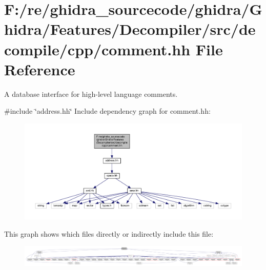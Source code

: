 \hypertarget{comment_8hh}{}\section{F\+:/re/ghidra\+\_\+sourcecode/ghidra/\+Ghidra/\+Features/\+Decompiler/src/decompile/cpp/comment.hh File Reference}
\label{comment_8hh}


A database interface for high-\/level language comments.  


{\ttfamily \#include \char`\"{}address.\+hh\char`\"{}}\newline
Include dependency graph for comment.\+hh\+:
\nopagebreak
\begin{figure}[H]
\begin{center}
\leavevmode
\includegraphics[width=350pt]{comment_8hh__incl}
\end{center}
\end{figure}
This graph shows which files directly or indirectly include this file\+:
\nopagebreak
\begin{figure}[H]
\begin{center}
\leavevmode
\includegraphics[width=350pt]{comment_8hh__dep__incl}
\end{center}
\end{figure}
